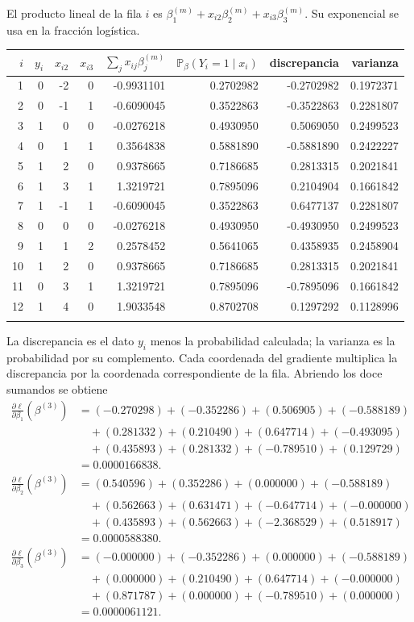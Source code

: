 \documentclass[11pt,a4paper]{article}
\newcommand{\Prob}{\mathbb P}
\begin{document}
El producto lineal de la fila \(i\) es
\(\beta_1^{(m)}+x_{i2}\beta_2^{(m)}+x_{i3}\beta_3^{(m)}\).
Su exponencial se usa en la fracción logística.
\begin{center}\scriptsize
\begin{tabular}{rrrrrrrr}\toprule
\(i\)&\(y_i\)&\(x_{i2}\)&\(x_{i3}\)&\(\sum_jx_{ij}\beta_j^{(m)}\)&\(\Prob_\beta(Y_i=1\mid x_i)\)&discrepancia&varianza\\\midrule
1&0&-2&0&-0.9931101&0.2702982&-0.2702982&0.1972371\\
2&0&-1&1&-0.6090045&0.3522863&-0.3522863&0.2281807\\
3&1&0&0&-0.0276218&0.4930950&0.5069050&0.2499523\\
4&0&1&1&0.3564838&0.5881890&-0.5881890&0.2422227\\
5&1&2&0&0.9378665&0.7186685&0.2813315&0.2021841\\
6&1&3&1&1.3219721&0.7895096&0.2104904&0.1661842\\
7&1&-1&1&-0.6090045&0.3522863&0.6477137&0.2281807\\
8&0&0&0&-0.0276218&0.4930950&-0.4930950&0.2499523\\
9&1&1&2&0.2578452&0.5641065&0.4358935&0.2458904\\
10&1&2&0&0.9378665&0.7186685&0.2813315&0.2021841\\
11&0&3&1&1.3219721&0.7895096&-0.7895096&0.1661842\\
12&1&4&0&1.9033548&0.8702708&0.1297292&0.1128996\\
\\\bottomrule\end{tabular}\end{center}
La discrepancia es el dato \(y_i\) menos la probabilidad
calculada; la varianza es la probabilidad por su complemento.
Cada coordenada del gradiente multiplica la discrepancia por
la coordenada correspondiente de la fila. Abriendo los doce
sumandos se obtiene
\[
\begin{aligned}
\frac{\partial\ell}{\partial\beta_1}(\beta^{(3)})&=(-0.270298)+(-0.352286)+(0.506905)+(-0.588189)\\&\quad+(0.281332)+(0.210490)+(0.647714)+(-0.493095)\\&\quad+(0.435893)+(0.281332)+(-0.789510)+(0.129729)\\&=0.0000166838.\end{aligned}
\]
\[
\begin{aligned}
\frac{\partial\ell}{\partial\beta_2}(\beta^{(3)})&=(0.540596)+(0.352286)+(0.000000)+(-0.588189)\\&\quad+(0.562663)+(0.631471)+(-0.647714)+(-0.000000)\\&\quad+(0.435893)+(0.562663)+(-2.368529)+(0.518917)\\&=0.0000588380.\end{aligned}
\]
\[
\begin{aligned}
\frac{\partial\ell}{\partial\beta_3}(\beta^{(3)})&=(-0.000000)+(-0.352286)+(0.000000)+(-0.588189)\\&\quad+(0.000000)+(0.210490)+(0.647714)+(-0.000000)\\&\quad+(0.871787)+(0.000000)+(-0.789510)+(0.000000)\\&=0.0000061121.\end{aligned}
\]
\end{document}

